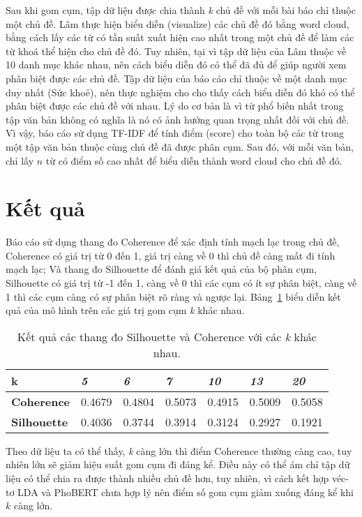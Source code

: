 Sau khi gom cụm, tập dữ liệu được chia thành \textit{k} chủ đề với mỗi bài báo chỉ thuộc một chủ đề. Lâm \cite{lamGomCumVan2021} thực hiện biểu diễn (visualize) các chủ đề đó bằng word cloud, bằng cách lấy các từ có tần suất xuất hiện cao nhất trong một chủ đề để làm các từ khoá thể hiện cho chủ đề đó.  Tuy nhiên, tại vì tập dữ liệu của Lâm \cite{lamGomCumVan2021} thuộc về 10 danh mục khác nhau, nên cách biểu diễn đó có thể đã đủ để giúp người xem phân biệt được các chủ đề. Tập dữ liệu của báo cáo chỉ thuộc về một danh mục duy nhất (Sức khoẻ), nên thực nghiệm cho cho thấy cách biểu diễn đó khó có thể phân biệt được các chủ đề với nhau. Lý do cơ bản là vì từ phổ biến nhất trong tập văn bản không có nghĩa là nó có ảnh hưởng quan trọng nhất đối với chủ đề. Vì vậy, báo cáo sử dụng TF-IDF để tính điểm (score) cho toàn bộ các từ trong một tập văn bản thuộc cùng chủ đề đã được phân cụm. Sau đó, với mỗi văn bản, chỉ lấy $n$ từ có điểm số cao nhất để biểu diễn thành word cloud cho chủ đề đó.

\section{Kết quả}
Báo cáo sử dụng thang đo Coherence để xác định tính mạch lạc trong chủ đề, Coherence có giá trị từ 0 đến 1, giá trị càng về 0 thì chủ đề càng mất đi tính mạch lạc; Và thang đo Silhouette để đánh giá kết quả của bộ phân cụm, Silhouette có giá trị từ -1 đến 1, càng về 0 thì các cụm có ít sự phân biệt, càng về 1 thì các cụm càng có sự phân biệt rõ ràng và ngược lại.  Bảng~\ref{table:result} biểu diễn kết quả của mô hình trên các giá trị gom cụm \textit{k} khác nhau.

\begin{table}[ht!]
    \centering
    \begin{tabular}{lllllll}
        \textbf{k}          & \textit{5} & \textit{6} & \textit{7} & \textit{10} & \textit{13} & \textit{20} \\ \hline
        \textbf{Coherence}  & 0.4679     & 0.4804     & 0.5073     & 0.4915      & 0.5009      & 0.5058      \\
        \textbf{Silhouette} & 0.4036     & 0.3744     & 0.3914     & 0.3124      & 0.2927      & 0.1921     
    \end{tabular}
    \caption{Kết quả các thang đo Silhouette và Coherence với các \textit{k}
    khác nhau.}
    \label{table:result}
\end{table}

Theo dữ liệu ta có thể thấy, \textit{k} càng lớn thì điểm Coherence thường càng cao, tuy nhiên  lớn sẽ giảm hiệu suất gom cụm đi đáng kể. Điều này có thể ám chỉ tập dữ liệu có thể chia ra được thành nhiều chủ đề hơn, tuy nhiên, vì cách kết hợp véc-tơ LDA và PhoBERT chưa hợp lý nên điểm số gom cụm giảm xuống đáng kể khi $k$ càng lớn.

